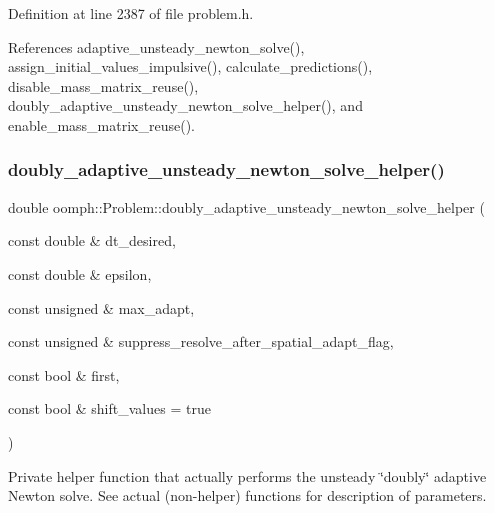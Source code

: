 Definition at line 2387 of file problem.\+h.



References adaptive\+\_\+unsteady\+\_\+newton\+\_\+solve(), assign\+\_\+initial\+\_\+values\+\_\+impulsive(), calculate\+\_\+predictions(), disable\+\_\+mass\+\_\+matrix\+\_\+reuse(), doubly\+\_\+adaptive\+\_\+unsteady\+\_\+newton\+\_\+solve\+\_\+helper(), and enable\+\_\+mass\+\_\+matrix\+\_\+reuse().

\mbox{\label{classoomph_1_1Problem_a71ba0a8ba4cbcb66077324217482ee11}} 
\subsubsection{\texorpdfstring{doubly\+\_\+adaptive\+\_\+unsteady\+\_\+newton\+\_\+solve\+\_\+helper()}{doubly\_adaptive\_unsteady\_newton\_solve\_helper()}}
{\footnotesize\ttfamily double oomph\+::\+Problem\+::doubly\+\_\+adaptive\+\_\+unsteady\+\_\+newton\+\_\+solve\+\_\+helper (\begin{DoxyParamCaption}\item[{const double \&}]{dt\+\_\+desired,  }\item[{const double \&}]{epsilon,  }\item[{const unsigned \&}]{max\+\_\+adapt,  }\item[{const unsigned \&}]{suppress\+\_\+resolve\+\_\+after\+\_\+spatial\+\_\+adapt\+\_\+flag,  }\item[{const bool \&}]{first,  }\item[{const bool \&}]{shift\+\_\+values = {\ttfamily true} }\end{DoxyParamCaption})\hspace{0.3cm}{\ttfamily [private]}}



Private helper function that actually performs the unsteady \char`\"{}doubly\char`\"{} adaptive Newton solve. See actual (non-\/helper) functions for description of parameters. 

